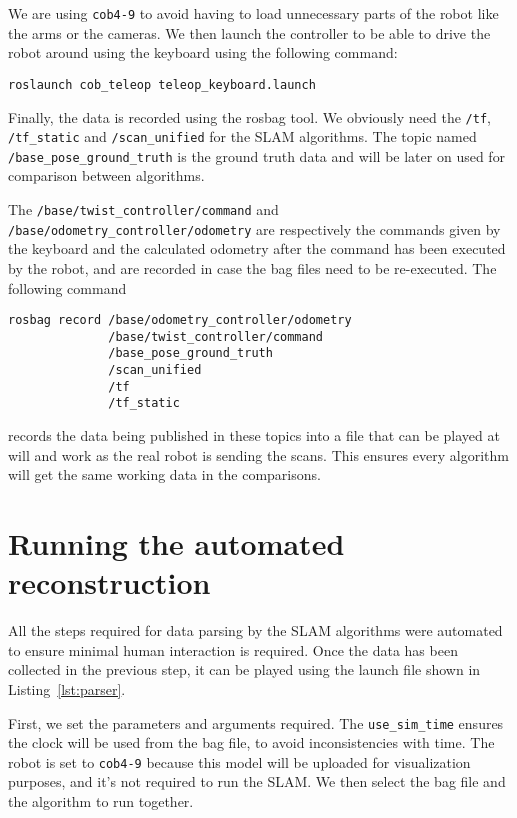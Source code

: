 We are using \texttt{cob4-9} to avoid having to load unnecessary parts of the robot like the arms or the cameras. We then launch the controller to be able to drive the robot around using the keyboard using the following command:

\begin{verbatim}
roslaunch cob_teleop teleop_keyboard.launch 
\end{verbatim}

Finally, the data is recorded using the rosbag tool. We obviously need the \texttt{/tf}, \texttt{/tf\_static} and \texttt{/scan\_unified} for the SLAM algorithms. The topic named \\
\texttt{/base\_pose\_ground\_truth} is the ground truth data and will be later on used for comparison between algorithms. 

The \texttt{/base/twist\_controller/command} and  \texttt{/base/odometry\_controller/odometry} are respectively the commands given by the keyboard and the calculated odometry after the command has been executed by the robot, and are recorded in case the bag files need to be re-executed. The following command

\begin{verbatim}
rosbag record /base/odometry_controller/odometry
              /base/twist_controller/command
              /base_pose_ground_truth
              /scan_unified
              /tf
              /tf_static
\end{verbatim}

\noindent records the data being published in these topics into a file that can be played at will and work as the real robot is sending the scans. This ensures every algorithm will get the same working data in the comparisons.

\section{Running the automated reconstruction}

All the steps required for data parsing by the SLAM algorithms were automated to ensure minimal human interaction is required. Once the data has been collected in the previous step, it can be played using the launch file shown in Listing~\ref{lst:parser}.

First, we set the parameters and arguments required. The \texttt{use\_sim\_time} ensures the clock will be used from the bag file, to avoid inconsistencies with time. The robot is set to \texttt{cob4-9} because this model will be uploaded for visualization purposes, and it's not required to run the SLAM. We then select the bag file and the algorithm to run together.

